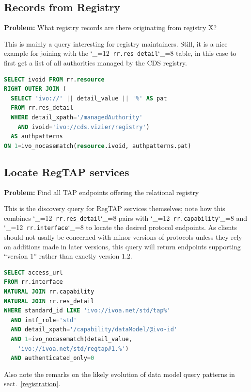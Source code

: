 \documentclass[11pt,a4paper]{ivoa}
\makeatletter
\def\rtent#1{\texttt{\color{rtcolor}\verb|#1|}}
\def\makeunderscoreletter{\catcode`\_=12}
\def\makeunderscoresubscript{\catcode`\_=8}
\def\rtent{\makeunderscoreletter\relax\rt@nt}
\def\rt@nt#1{\texttt{\color{rtcolor} #1}\makeunderscoresubscript{}}
\makeatother
\begin{document}
\subsection{Records from Registry}

\textbf{Problem:} What registry records are
there originating from registry X?

This is mainly a query interesting for registry maintainers.  Still,
it is a nice example for joining with the
\rtent{rr.res_detail} table, in this case to
first get a list of all authorities managed by the CDS registry.


\begin{lstlisting}[language=SQL,flexiblecolumns=true]
SELECT ivoid FROM rr.resource
RIGHT OUTER JOIN (
  SELECT 'ivo://' || detail_value || '%' AS pat
  FROM rr.res_detail
  WHERE detail_xpath='/managedAuthority'
    AND ivoid='ivo://cds.vizier/registry')
  AS authpatterns
ON 1=ivo_nocasematch(resource.ivoid, authpatterns.pat)
\end{lstlisting}

\subsection{Locate RegTAP services}
\label{ex:find-regtap}

\textbf{Problem:} Find all TAP endpoints offering the relational
registry

This is the discovery query for RegTAP services themselves;  note how
this combines
\rtent{rr.res_detail} pairs with
\rtent{rr.capability}
and
\rtent{rr.interface} to locate the desired protocol
endpoints.  As clients should not usally be concerned with minor
versions of protocols unless  they rely on additions made in later
versions, this query will return endpoints supporting ``version 1'' rather
than exactly version 1.2.


\begin{lstlisting}[language=SQL,flexiblecolumns=true]
SELECT access_url
FROM rr.interface
NATURAL JOIN rr.capability
NATURAL JOIN rr.res_detail
WHERE standard_id LIKE 'ivo://ivoa.net/std/tap%'
  AND intf_role='std'
  AND detail_xpath='/capability/dataModel/@ivo-id'
  AND 1=ivo_nocasematch(detail_value,
    'ivo://ivoa.net/std/regtap#1.%')
  AND authenticated_only=0
\end{lstlisting}

Also note the remarks on the likely evolution of data model query
patterns in sect.~\ref{registration}.
\end{document}
